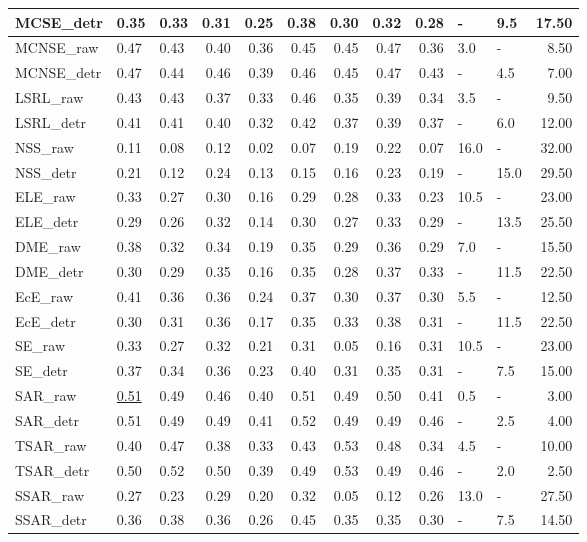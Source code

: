 \begin{tabular}{lllrrrrrrllr}
MCSE\_detr & 0.35 & 0.33 & 0.31 & 0.25 & 0.38 & 0.30 & 0.32 & 0.28 & - & 9.5 & 17.50 \\
\midrule
MCNSE\_raw & 0.47 & 0.43 & 0.40 & 0.36 & 0.45 & 0.45 & 0.47 & 0.36 & 3.0 & - & 8.50 \\
MCNSE\_detr & 0.47 & 0.44 & 0.46 & 0.39 & 0.46 & 0.45 & 0.47 & 0.43 & - & 4.5 & 7.00 \\
\midrule
LSRL\_raw & 0.43 & 0.43 & 0.37 & 0.33 & 0.46 & 0.35 & 0.39 & 0.34 & 3.5 & - & 9.50 \\
LSRL\_detr & 0.41 & 0.41 & 0.40 & 0.32 & 0.42 & 0.37 & 0.39 & 0.37 & - & 6.0 & 12.00 \\
\midrule
NSS\_raw & 0.11 & 0.08 & 0.12 & 0.02 & 0.07 & 0.19 & 0.22 & 0.07 & 16.0 & - & 32.00 \\
NSS\_detr & 0.21 & 0.12 & 0.24 & 0.13 & 0.15 & 0.16 & 0.23 & 0.19 & - & 15.0 & 29.50 \\
\midrule
ELE\_raw & 0.33 & 0.27 & 0.30 & 0.16 & 0.29 & 0.28 & 0.33 & 0.23 & 10.5 & - & 23.00 \\
ELE\_detr & 0.29 & 0.26 & 0.32 & 0.14 & 0.30 & 0.27 & 0.33 & 0.29 & - & 13.5 & 25.50 \\
\midrule
DME\_raw & 0.38 & 0.32 & 0.34 & 0.19 & 0.35 & 0.29 & 0.36 & 0.29 & 7.0 & - & 15.50 \\
DME\_detr & 0.30 & 0.29 & 0.35 & 0.16 & 0.35 & 0.28 & 0.37 & 0.33 & - & 11.5 & 22.50 \\
\midrule
EcE\_raw & 0.41 & 0.36 & 0.36 & 0.24 & 0.37 & 0.30 & 0.37 & 0.30 & 5.5 & - & 12.50 \\
EcE\_detr & 0.30 & 0.31 & 0.36 & 0.17 & 0.35 & 0.33 & 0.38 & 0.31 & - & 11.5 & 22.50 \\
\midrule
SE\_raw & 0.33 & 0.27 & 0.32 & 0.21 & 0.31 & 0.05 & 0.16 & 0.31 & 10.5 & - & 23.00 \\
SE\_detr & 0.37 & 0.34 & 0.36 & 0.23 & 0.40 & 0.31 & 0.35 & 0.31 & - & 7.5 & 15.00 \\
\midrule
SAR\_raw & \underline{0.51} & 0.49 & 0.46 & 0.40 & 0.51 & 0.49 & 0.50 & 0.41 & 0.5 & - & 3.00 \\
SAR\_detr & 0.51 & 0.49 & 0.49 & 0.41 & 0.52 & 0.49 & 0.49 & 0.46 & - & 2.5 & 4.00 \\
\midrule
TSAR\_raw & 0.40 & 0.47 & 0.38 & 0.33 & 0.43 & 0.53 & 0.48 & 0.34 & 4.5 & - & 10.00 \\
TSAR\_detr & 0.50 & 0.52 & 0.50 & 0.39 & 0.49 & 0.53 & 0.49 & 0.46 & - & 2.0 & 2.50 \\
\midrule
SSAR\_raw & 0.27 & 0.23 & 0.29 & 0.20 & 0.32 & 0.05 & 0.12 & 0.26 & 13.0 & - & 27.50 \\
SSAR\_detr & 0.36 & 0.38 & 0.36 & 0.26 & 0.45 & 0.35 & 0.35 & 0.30 & - & 7.5 & 14.50 \\
\midrule
\bottomrule
\end{tabular}
\midrule
